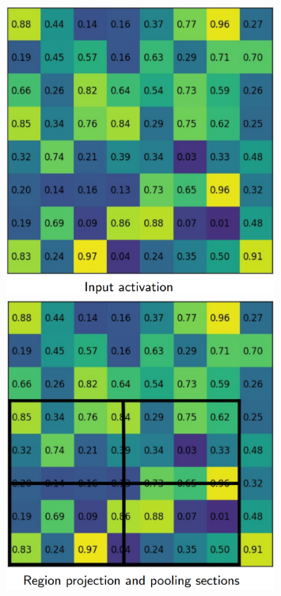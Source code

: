 \begin{figure}[htbp]
	\centering
	\begin{minipage}{0.5\textwidth}
		\centering
		\includegraphics[width=0.8\textwidth]{images/roialign1.PNG} %
	\end{minipage}\hfill
	\begin{minipage}{0.5\textwidth}
		\centering
		\includegraphics[width=0.8\textwidth]{images/roialign2.PNG} %
	\end{minipage}
\end{figure}

